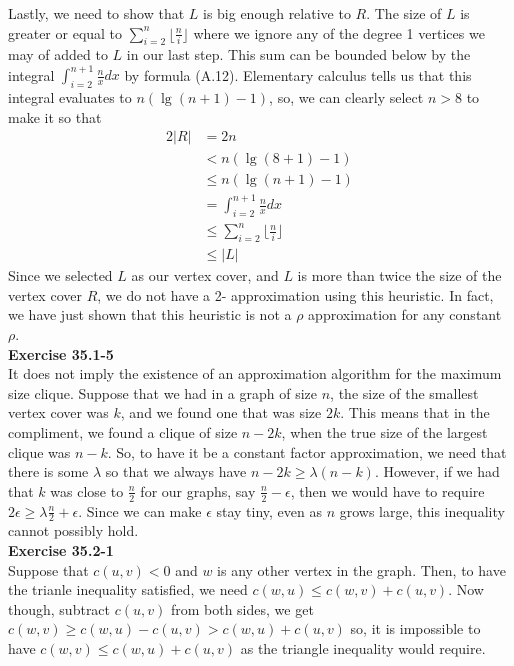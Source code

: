 \documentclass{article}
\begin{document}
Lastly, we need to show that $L$ is big enough relative to $R$. The size of $L$ is greater or equal to $\sum_{i=2}^n \lfloor\frac{n}{i}\rfloor $ where we ignore any of the degree 1 vertices we may of added to $L$ in our last step. This sum can be bounded below by the integral $\int_{i=2}^{n+1} \frac{n}{x}dx$ by formula (A.12). Elementary calculus tells us that this integral evaluates to $n(\lg(n+1) - 1)$, so, we can clearly select $n>8$ to make it so that 
\begin{align*}
2|R| &= 2n\\
 &< n(\lg(8+1) -1)\\
  &\le n(\lg(n+1) - 1)\\
  &=\int_{i=2}^{n+1} \frac{n}{x}dx\\
  &\le \sum_{i=2}^n \lfloor\frac{n}{i}\rfloor\\
  &\le |L|
  \end{align*}
  Since we selected $L$ as our vertex cover, and $L$ is more than twice the size of the vertex cover $R$, we do not have a 2- approximation using this heuristic. In fact, we have just shown that this heuristic is not a $\rho$ approximation for any constant $\rho$.\\
  
  


\noindent\textbf{Exercise 35.1-5}\\

It does not imply the existence of an approximation algorithm for the maximum size clique. Suppose that we had in a graph of size $n$, the size of the smallest vertex cover was $k$, and we found one that was size $2k$. This means that in the compliment, we found a clique of size $n-2k$, when the true size of the largest clique was $n-k$. So, to have it be a constant factor approximation, we need that there is some $\lambda$ so that we always have $n-2k \ge \lambda (n-k)$. However, if we had that $k$ was close to $\frac{n}{2}$ for our graphs, say $\frac{n}{2}-\epsilon$, then we would have to require $2\epsilon \ge \lambda \frac{n}{2} + \epsilon$. Since we can make $\epsilon$ stay tiny, even as $n$ grows large, this inequality cannot possibly hold.\\




\noindent\textbf{Exercise 35.2-1}\\

Suppose that $c(u,v) < 0$ and $w$ is any other vertex in the graph. Then, to have the trianle inequality satisfied, we need $c(w,u) \le c(w,v) + c(u,v)$. Now though, subtract $c(u,v)$ from both sides, we get $c(w,v) \ge c(w,u) - c(u,v) > c(w,u) +c(u,v)$ so, it is impossible to have $c(w,v) \le c(w,u)+c(u,v)$ as the triangle inequality would require.\\
\end{document}

